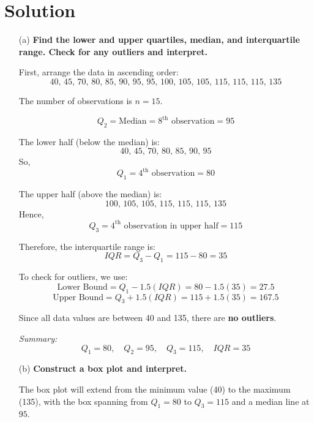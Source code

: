 \documentclass[12pt]{article}
\begin{document}
\section*{Solution}

\begin{enumerate}
    \item[(a)] \textbf{Find the lower and upper quartiles, median, and interquartile range. Check for any outliers and interpret.}
    
    \vspace{0.5em}
    First, arrange the data in ascending order:
    \[
    40,\, 45,\, 70,\, 80,\, 85,\, 90,\, 95,\, 95,\, 100,\, 105,\, 105,\, 115,\, 115,\, 115,\, 135
    \]
    
    The number of observations is $n = 15$.
    
    \[
    Q_2 = \text{Median} = 8^{\text{th}} \text{ observation} = 95
    \]
    
    The lower half (below the median) is:
    \[
    40,\, 45,\, 70,\, 80,\, 85,\, 90,\, 95
    \]
    So,
    \[
    Q_1 = 4^{\text{th}} \text{ observation} = 80
    \]
    
    The upper half (above the median) is:
    \[
    100,\, 105,\, 105,\, 115,\, 115,\, 115,\, 135
    \]
    Hence,
    \[
    Q_3 = 4^{\text{th}} \text{ observation in upper half} = 115
    \]
    
    Therefore, the interquartile range is:
    \[
    IQR = Q_3 - Q_1 = 115 - 80 = 35
    \]
    
    To check for outliers, we use:
    \[
    \text{Lower Bound} = Q_1 - 1.5(IQR) = 80 - 1.5(35) = 27.5
    \]
    \[
    \text{Upper Bound} = Q_3 + 1.5(IQR) = 115 + 1.5(35) = 167.5
    \]
    
    Since all data values are between 40 and 135, there are \textbf{no outliers}.
    
    \vspace{0.5em}
    \textit{Summary:}
    \[
    Q_1 = 80, \quad Q_2 = 95, \quad Q_3 = 115, \quad IQR = 35
    \]

    \item[(b)] \textbf{Construct a box plot and interpret.}
    
    The box plot will extend from the minimum value (40) to the maximum (135), 
    with the box spanning from $Q_1 = 80$ to $Q_3 = 115$ and a median line at $95$.


\end{enumerate}
\end{document}

